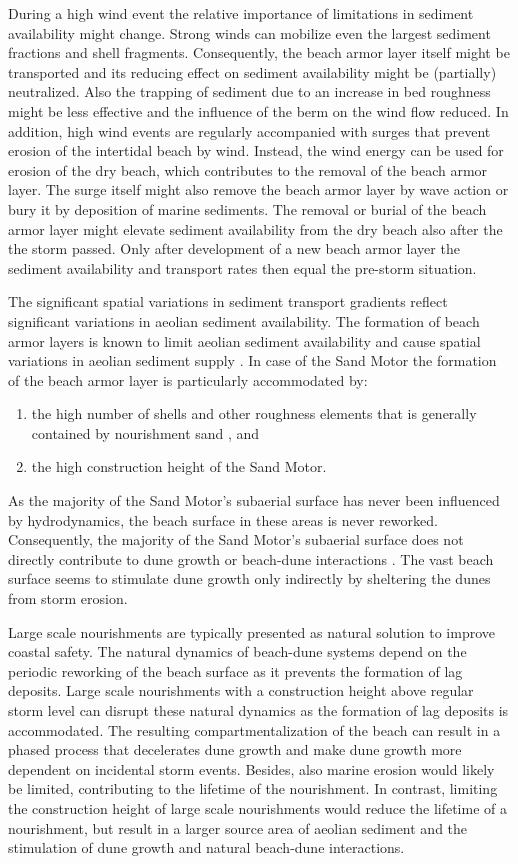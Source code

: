 During a high wind event the relative importance of limitations in
sediment availability might change. Strong winds can mobilize even the
largest sediment fractions and shell fragments. Consequently, the
beach armor layer itself might be transported and its reducing effect
on sediment availability might be (partially) neutralized. Also the
trapping of sediment due to an increase in bed roughness might be less
effective and the influence of the berm on the wind flow reduced. In
addition, high wind events are regularly accompanied with surges that
prevent erosion of the intertidal beach by wind. Instead, the wind
energy can be used for erosion of the dry beach, which contributes to
the removal of the beach armor layer. The surge itself might also
remove the beach armor layer by wave action or bury it by deposition
of marine sediments. The removal or burial of the beach armor layer
might elevate sediment availability from the dry beach also after the
the storm passed. Only after development of a new beach armor layer
the sediment availability and transport rates then equal the pre-storm
situation.

The significant spatial variations in sediment transport gradients
reflect significant variations in aeolian sediment availability. The
formation of beach armor layers is known to limit aeolian sediment
availability \citep{McKennaNeuman2012} and cause spatial variations in
aeolian sediment supply \citep{Jackson2010}. In case of the Sand Motor
the formation of the beach armor layer is particularly accommodated
by:
\begin{enumerate}
\item the high number of shells and other roughness elements that is
  generally contained by nourishment sand \citep{VanDerWal1998,
    VanDerWal2000}, and
\item the high construction height of the Sand Motor.
\end{enumerate}
As the majority of the Sand Motor's subaerial surface has never been
influenced by hydrodynamics, the beach surface in these areas is never
reworked. Consequently, the majority of the Sand Motor's subaerial
surface does not directly contribute to dune growth or beach-dune
interactions \citep{Houser2013}. The vast beach surface seems to
stimulate dune growth only indirectly by sheltering the dunes from
storm erosion.

Large scale nourishments are typically presented as natural solution
to improve coastal safety. The natural dynamics of beach-dune systems
depend on the periodic reworking of the beach surface as it prevents
the formation of lag deposits. Large scale nourishments with a
construction height above regular storm level can disrupt these
natural dynamics as the formation of lag deposits is accommodated. The
resulting compartmentalization of the beach can result in a phased
process that decelerates dune growth and make dune growth more
dependent on incidental storm events. Besides, also marine erosion
would likely be limited, contributing to the lifetime of the
nourishment.  In contrast, limiting the construction height of large
scale nourishments would reduce the lifetime of a nourishment, but
result in a larger source area of aeolian sediment and the stimulation
of dune growth and natural beach-dune interactions.

